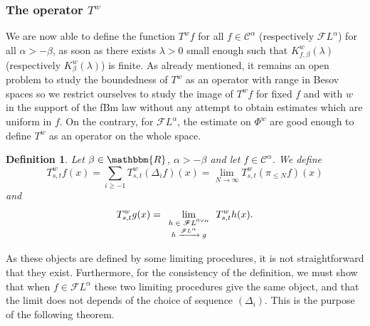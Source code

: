 \documentclass[a4paper,11pt]{article}
\newcommand{\tmscript}[1]{\text{\scriptsize{$#1$}}}
\newtheorem{definition}[theorem]{Definition}
\newcommand{\CC}{\mathscr C}
\newcommand{\CF}{\mathscr F}
\begin{document}
\subsubsection{The operator $T^{w}$}
\label{sec:bounds-on-Tw}

We are now able to define the function $T^{w} f$ for all $f \in \CC^{\alpha}$
(respectively $\CF L^{\alpha}$) for all $\alpha >- \beta$, as soon as there
exists $\lambda >0$ small enough such that $K^{w}_{f, \beta} ( \lambda )$
(respectively $K^{w}_{\beta} ( \lambda )$) is finite. As already mentioned,
it remains an open problem to study the boundedness of $T^{w}$ as an operator
with range in Besov spaces so we restrict ourselves to study the image of
$T^{w} f$ for fixed $f$ and with $w$ in the support of the fBm law without any
attempt to obtain estimates which are uniform in $f$. On the contrary, for
$\CF L^{\alpha}$, the estimate on $\Phi^{w}$ are good enough to define $T^{w}$
as an operator on the whole space.

\begin{definition}
  Let $\beta \in \mathbbm{R}$, $\alpha >- \beta$ and let $f \in \CC^{\alpha}$.
  We define
  \[ T^{w}_{s,t} f ( x ) = \sum_{i \geqslant -1} T^{w}_{s,t} ( \Delta_{i} f )
     ( x )  =  \lim_{N \rightarrow \infty} T^{w}_{s,t} ( \pi_{\leqslant N} f )
     ( x ) \]
  and
  \[ T^{w}_{s,t} g ( x ) = \lim_{\tmscript{\begin{array}{c}
       h \in \CF L^{0 \vee \alpha}\\
       h \xrightarrow{\CF L^{\alpha}} g
     \end{array}}} T^{w}_{s,t} h ( x ). \]
\end{definition}

As these objects are defined by some limiting procedures, it is not
straightforward that they exist. Furthermore, for the consistency of the
definition, we must show that when $f \in \CF L^{\alpha}$ these two limiting
procedures give the same object, and that the limit does not depends of the
choice of sequence $( \Delta_{i} )$. This is the purpose of the following
theorem.
\end{document}
